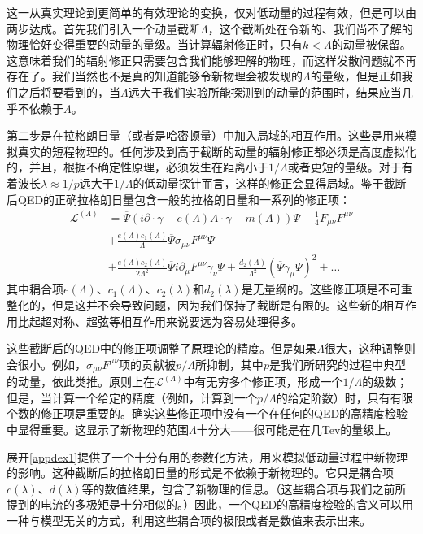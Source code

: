 \documentclass[cs4size,titlepage,twoside]{ctexart}
\begin{document}
\begin{appendices}
这一从真实理论到更简单的有效理论的变换，仅对低动量的过程有效，但是可以由两步达成。首先我们引入一个动量截断$\Lambda$，这个截断处在令新的、我们尚不了解的物理恰好变得重要的动量的量级。当计算辐射修正时，只有$k<\Lambda$的动量被保留。这意味着我们的辐射修正只需要包含我们能够理解的物理，而这样发散问题就不再存在了。我们当然也不是真的知道能够令新物理会被发现的$\Lambda$的量级，但是正如我们之后将要看到的，当$\Lambda$远大于我们实验所能探测到的动量的范围时，结果应当几乎不依赖于$\Lambda$。

第二步是在拉格朗日量（或者是哈密顿量）中加入局域的相互作用。这些是用来模拟真实的短程物理的。任何涉及到高于截断的动量的辐射修正都必须是高度虚拟化的，并且，根据不确定性原理，必须发生在距离小于$1/\Lambda$或者更短的量级。对于有着波长$\lambda\approx1/p$远大于$1/\Lambda$的低动量探针而言，这样的修正会显得局域。鉴于截断后QED的正确拉格朗日量包含一般的拉格朗日量和一系列的修正项：
\begin{align}\label{appdex1}
 \nonumber \mathcal{L}^{(\Lambda)}  &=\overline{\Psi}(i\partial\cdot\gamma-e(\Lambda)A\cdot\gamma-m(\Lambda))\Psi-\frac{1}{4}F_{\mu\nu}F^{\mu\nu}\\ \nonumber & + \frac{e(\Lambda)c_1(\Lambda)}{\Lambda}\overline{\Psi}\sigma_{\mu\nu}F^{\mu\nu}\Psi \\
  & + \frac{e(\Lambda)c_2(\Lambda)}{2\Lambda^2}\overline{\Psi}i\partial_{\mu}F^{\mu\nu}\gamma_{\nu}\Psi+\frac{d_2(\Lambda)}{\Lambda^2}(\overline{\Psi}\gamma_{\mu}\Psi)^2+\dots
\end{align}
其中耦合项$e(\Lambda)$、$c_1(\Lambda)$、$c_2(\lambda)$和$d_2(\lambda)$是无量纲的。这些修正项是不可重整化的，但是这并不会导致问题，因为我们保持了截断是有限的。这些新的相互作用比起超对称、超弦等相互作用来说要远为容易处理得多。

这些截断后的QED中的修正项调整了原理论的精度。但是如果$\Lambda$很大，这种调整则会很小。例如，$\sigma_{\mu\nu}F^{\mu\nu}$项的贡献被$p/\Lambda$所抑制，其中$p$是我们所研究的过程中典型的动量，依此类推。原则上在$\mathcal{L}^{(\Lambda)}  $中有无穷多个修正项，形成一个$1/\Lambda$的级数；但是，当计算一个给定的精度（例如，计算到一个$p/\Lambda$的给定阶数）时，只有有限个数的修正项是重要的。确实这些修正项中没有一个在任何的QED的高精度检验中显得重要。这显示了新物理的范围$\Lambda$十分大——很可能是在几Tev的量级上。

展开\eqref{appdex1}提供了一个十分有用的参数化方法，用来模拟低动量过程中新物理的影响。这种截断后的拉格朗日量的形式是不依赖于新物理的。它只是耦合项$c(\lambda)$、$d(\lambda)$等的数值结果，包含了新物理的信息。（这些耦合项与我们之前所提到的电流的多极矩是十分相似的。）因此，一个QED的高精度检验的含义可以用一种与模型无关的方式，利用这些耦合项的极限或者是数值来表示出来。


\end{appendices}
\end{document}
